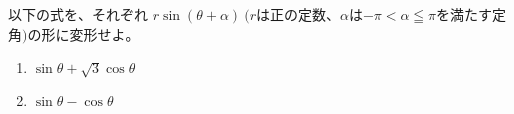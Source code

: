 \documentclass[8pt,dvipdfmx]{article}[b5paper]
\begin{document}
\begin{tcolorbox}[title=数学\textcircled{\scriptsize 3} 2-2 A]
以下の式を、それぞれ $r\sin(\theta+\alpha)\ (r$は正の定数、$\alpha$は$-\pi<\alpha\leqq\pi$を満たす定角$)$の形に変形せよ。
\begin{enumerate}[(1)]
\item $\sin\theta+\sqrt{3}\cos\theta$
\item $\sin\theta-\cos\theta$
\end{enumerate}
\end{tcolorbox}




\end{document}
